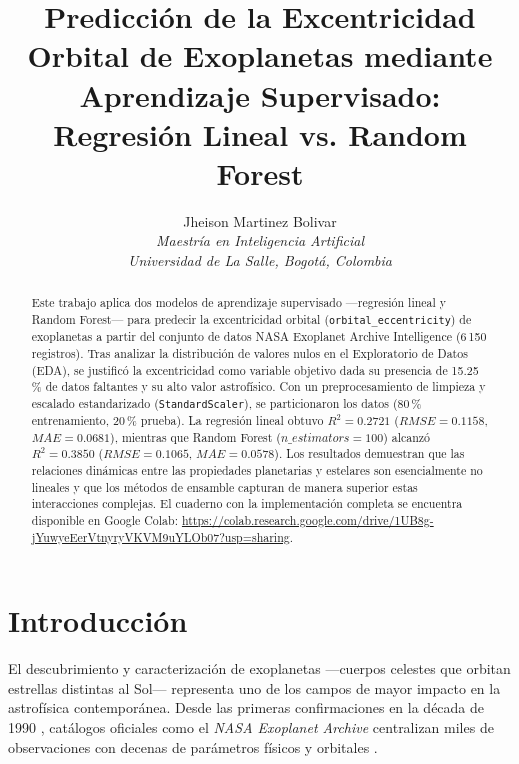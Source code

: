 \documentclass[10pt,journal]{IEEEtran}
\begin{document}
  \title{Predicci\'on de la Excentricidad Orbital de Exoplanetas mediante Aprendizaje Supervisado:\\
    Regresi\'on Lineal vs. Random Forest}

  \author{
    Jheison Martinez Bolivar\\
    \textit{Maestr\'ia en Inteligencia Artificial}\\
    \textit{Universidad de La Salle, Bogot\'a, Colombia}\\
  }
  \maketitle

  \begin{abstract}
    Este trabajo aplica dos modelos de aprendizaje supervisado ---regresi\'on lineal y Random Forest--- para predecir la excentricidad orbital (\texttt{orbital\_eccentricity}) de exoplanetas a partir del conjunto de datos NASA Exoplanet Archive Intelligence (6\,150 registros). Tras analizar la distribuci\'on de valores nulos en el Exploratorio de Datos (EDA), se justific\'o la excentricidad como variable objetivo dada su presencia de 15.25\,\% de datos faltantes y su alto valor astrof\'isico. Con un preprocesamiento de limpieza y escalado estandarizado (\texttt{StandardScaler}), se particionaron los datos (80\,\% entrenamiento, 20\,\% prueba). La regresi\'on lineal obtuvo $R^2 = 0.2721$ ($RMSE = 0.1158$, $MAE = 0.0681$), mientras que Random Forest ($n\_estimators=100$) alcanz\'o $R^2 = 0.3850$ ($RMSE = 0.1065$, $MAE = 0.0578$). Los resultados demuestran que las relaciones din\'amicas entre las propiedades planetarias y estelares son esencialmente no lineales y que los m\'etodos de ensamble capturan de manera superior estas interacciones complejas. El cuaderno con la implementaci\'on completa se encuentra disponible en Google Colab: \url{https://colab.research.google.com/drive/1UB8g-jYuwyeEerVtnyryVKVM9uYLOb07?usp=sharing}.
  \end{abstract}

  \section{Introducci\'on}

  El descubrimiento y caracterizaci\'on de exoplanetas ---cuerpos celestes que orbitan estrellas distintas al Sol--- representa uno de los campos de mayor impacto en la astrof\'isica contempor\'anea. Desde las primeras confirmaciones en la d\'ecada de 1990 \cite{wolszczan1992}, cat\'alogos oficiales como el \emph{NASA Exoplanet Archive} centralizan miles de observaciones con decenas de par\'ametros f\'isicos y orbitales \cite{nasa_exoplanet_archive_2026}.
\end{document}
